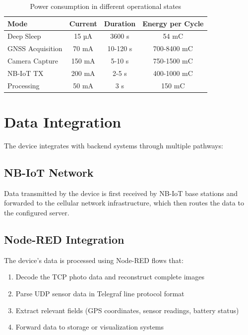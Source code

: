 \documentclass[11pt,a4paper]{article}
\begin{document}
\begin{table}[h]
\centering
\begin{tabular}{@{}lccc@{}}
\toprule
\textbf{Mode} & \textbf{Current} & \textbf{Duration} & \textbf{Energy per Cycle} \\
\midrule
Deep Sleep & 15 µA & 3600 s & 54 mC \\
GNSS Acquisition & 70 mA & 10-120 s & 700-8400 mC \\
Camera Capture & 150 mA & 5-10 s & 750-1500 mC \\
NB-IoT TX & 200 mA & 2-5 s & 400-1000 mC \\
Processing & 50 mA & 3 s & 150 mC \\
\bottomrule
\end{tabular}
\caption{Power consumption in different operational states}
\label{tab:power}
\end{table}

\section{Data Integration}

The device integrates with backend systems through multiple pathways:

\subsection{NB-IoT Network}

Data transmitted by the device is first received by NB-IoT base stations and forwarded to the cellular network infrastructure, which then routes the data to the configured server.

\subsection{Node-RED Integration}

The device's data is processed using Node-RED flows that:

\begin{enumerate}
    \item Decode the TCP photo data and reconstruct complete images
    \item Parse UDP sensor data in Telegraf line protocol format
    \item Extract relevant fields (GPS coordinates, sensor readings, battery status)
    \item Forward data to storage or visualization systems
\end{enumerate}
\end{document}
